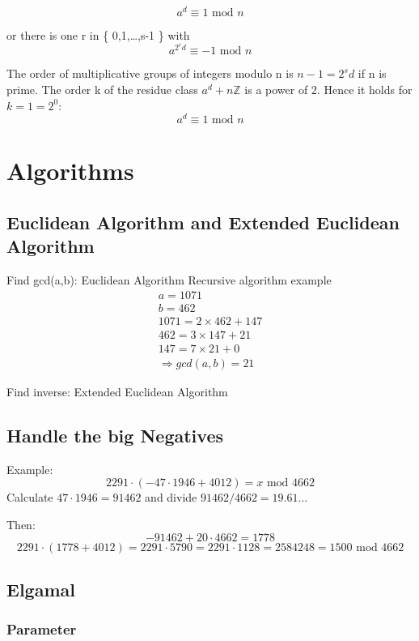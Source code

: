 \documentclass[a4paper]{article}
\begin{document}
\[ a^d \equiv 1 \text{ mod } n \]

or there is one r in \{ 0,1,\dots,s-1 \} with
\[ a^{2^r d} \equiv -1 \text{ mod } n \]

The order of multiplicative groups of integers modulo n is $n-1=2^sd$ if n is prime. The order k of the residue class $a^d + n\mathbb{Z}$ is a power of 2. Hence it holds for $k = 1 = 2^0$:
\[ a^d \equiv 1 \text{ mod } n \]

\section{Algorithms}
\subsection{Euclidean Algorithm and Extended Euclidean Algorithm}
Find gcd(a,b): Euclidean Algorithm
Recursive algorithm example 
\begin{equation}
    \begin{split}
	a = 1071 \\
	b = 462 \\
	1071 = 2 \times 462 +  147 \\
	462 = 3 \times  147 + 21 \\
	147 = 7 \times 21 + 0 \\ 
	\Rightarrow gcd(a,b) = 21
    \end{split}
        \label{euclidean_example}
\end{equation}

Find inverse: Extended Euclidean Algorithm
\subsection{Handle the big Negatives}
Example:
\[ 2291 \cdot (-47 \cdot 1946 + 4012) = x \text{ mod } 4662\]
Calculate $47 \cdot 1946 = 91462$ and divide $91462/4662 = 19.61\dots$

Then:
\[ -91462 + 20 \cdot 4662 = 1778 \]
\[2291 \cdot (1778 + 4012) = 2291 \cdot 5790 = 2291 \cdot 1128 = 2584248 = 1500 \text{ mod } 4662\]
\subsection{Elgamal}
\subsubsection{Parameter}
\end{document}
